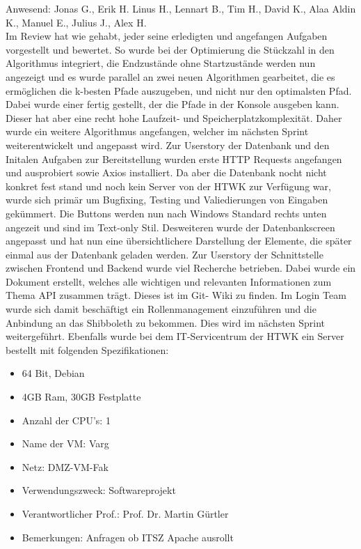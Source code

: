 Anwesend: Jonas G., Erik H. Linus H., Lennart B., Tim H., David K., Alaa Aldin K., Manuel E., Julius J., Alex H.\\


Im Review hat wie gehabt, jeder seine erledigten und angefangen Aufgaben vorgestellt und bewertet. So wurde bei der Optimierung die Stückzahl in den Algorithmus integriert, die Endzustände ohne Startzustände werden nun angezeigt und es wurde parallel an zwei neuen Algorithmen gearbeitet, die es ermöglichen die k-besten Pfade auszugeben, und nicht nur den optimalsten Pfad. Dabei wurde einer fertig gestellt, der die Pfade in der Konsole ausgeben kann. Dieser hat aber eine recht hohe Laufzeit- und Speicherplatzkomplexität. Daher wurde ein weitere Algorithmus angefangen, welcher im nächsten Sprint weiterentwickelt und angepasst wird. Zur Userstory der Datenbank und den Initalen Aufgaben zur Bereitstellung wurden erste HTTP Requests angefangen und ausprobiert sowie Axios installiert. Da aber die Datenbank nocht nicht konkret fest stand und noch kein Server von der HTWK zur Verfügung war, wurde sich primär um Bugfixing, Testing und Valiedierungen von Eingaben gekümmert. Die Buttons werden nun nach Windows Standard rechts unten angezeit und sind im Text-only Stil. Desweiteren wurde der Datenbankscreen angepasst und hat nun eine übersichtlichere Darstellung der Elemente, die später einmal aus der Datenbank geladen werden. Zur Userstory der Schnittstelle zwischen Frontend und Backend wurde viel Recherche betrieben. Dabei wurde ein Dokument erstellt, welches alle wichtigen und relevanten Informationen zum Thema API zusammen trägt. Dieses ist im Git- Wiki zu finden. Im Login Team wurde sich damit beschäftigt ein Rollenmanagement einzuführen und die Anbindung an das Shibboleth zu bekommen. Dies wird im nächsten Sprint weitergeführt. Ebenfalls wurde bei dem IT-Servicentrum der HTWK ein Server bestellt mit folgenden Spezifikationen:
\begin{itemize}
	\item 64 Bit, Debian
	\item 4GB Ram, 30GB Festplatte
	\item Anzahl der CPU's: 1
	\item Name der VM: Varg
	\item Netz: DMZ-VM-Fak
	\item Verwendungszweck: Softwareprojekt
	\item Verantwortlicher Prof.: Prof. Dr. Martin Gürtler
	\item Bemerkungen: Anfragen ob ITSZ Apache ausrollt\newline
\end{itemize}


